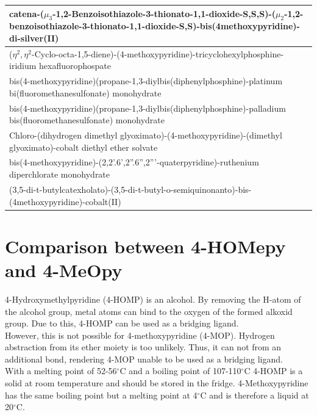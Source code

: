 \begin{longtable}{|p{}|}
\hline
catena-($\mu_3$-1,2-Benzoisothiazole-3-thionato-1,1-dioxide-S,S,S)-($\mu_2$-1,2-benzoisothiazole-3-thionato-1,1-dioxide-S,S)-bis(4methoxypyridine)-di-silver(II) \cite{dennehy2010}\\
\hline
($\eta^2, \eta^2$-Cyclo-octa-1,5-diene)-(4-methoxypyridine)-tricyclohexylphosphine-iridium hexafluorophospate \cite{mantilli2012}\\
\hline
bis(4-methoxypyridine)(propane-1,3-diylbis(diphenylphosphine)-platinum bi(fluoromethanesulfonate) monohydrate \cite{weilandt2012}\\
\hline
bis(4-methoxypyridine)(propane-1,3-diylbis(diphenylphosphine)-palladium bis(fluoromethanesulfonate) monohydrate \cite{weilandt2012}\\
\hline
Chloro-(dihydrogen dimethyl glyoximato)-(4-methoxypyridine)-(dimethyl glyoximato)-cobalt diethyl ether solvate \cite{wakerley2014}\\
\hline
bis(4-methoxypyridine)-(2,2'.6',2''.6'',2'''-quaterpyridine)-ruthenium diperchlorate monohydrate \cite{liu2014}\\
\hline
(3,5-di-t-butylcatexholato)-(3,5-di-t-butyl-o-semiquinonanto)-bis-(4methoxypyridine)-cobalt(II) \cite{schmidt2010}\\
\hline

 \end{longtable} 
 
 
 \section{Comparison between 4-HOMepy and 4-MeOpy}
 4-Hydroxymethylpyridine (4-HOMP) is an alcohol. By removing the H-atom of the alcohol group, metal atoms can bind to the oxygen of the formed alkoxid group. Due to this, 4-HOMP can be used as a bridging ligand. \\
However, this is not possible for 4-methoxypyridine (4-MOP). Hydrogen abstraction from its ether moiety is too unlikely. Thus, it can not from an additional bond, rendering 4-MOP unable to be used as a bridging ligand.\\
With a melting point of 52-56$^\circ$C and a boiling point of 107-110$^\circ$C 4-HOMP is a solid at room temperature and should be stored in the fridge. 4-Methoxypyridine has the same boiling point but a melting point at 4$^\circ$C and is therefore a liquid at 20$^\circ$C. \cite{sigma} \cite{sigma2}
